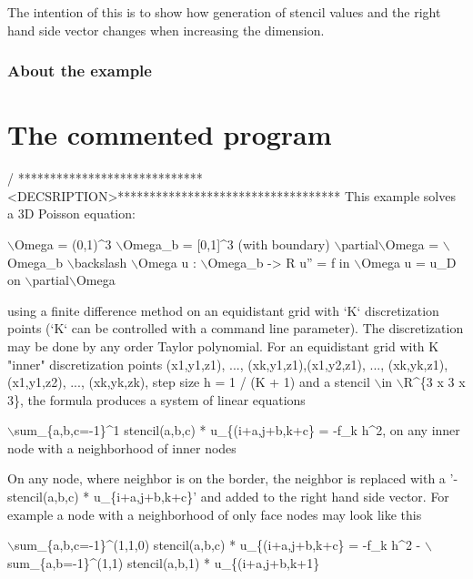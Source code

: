 The intention of this is to show how generation of stencil values and the right hand side vector changes when increasing the dimension.

\label{_Abouttheexample}%
\subsubsection*{About the example }

\label{_CommProg}%
 \section*{The commented program}


\begin{DoxyCode}
/ *****************************<DECSRIPTION>***********************************
This example solves a 3D Poisson equation:

    \(\backslash\)Omega = (0,1)^3
    \(\backslash\)Omega\_b = [0,1]^3   (with boundary)
    \(\backslash\)partial\(\backslash\)Omega = \(\backslash\)Omega\_b \(\backslash\)backslash \(\backslash\)Omega
    u : \(\backslash\)Omega\_b -> R
    u\textcolor{stringliteral}{''} = f in \(\backslash\)Omega
    u = u\_D on \(\backslash\)partial\(\backslash\)Omega

\textcolor{keyword}{using} a finite difference method on an equidistant grid with `K` discretization
points (`K` can be controlled with a command line parameter). The discretization
may be done by any order Taylor polynomial.
For an equidistant grid with K \textcolor{stringliteral}{"inner"} discretization points (x1,y1,z1), ...,
(xk,y1,z1),(x1,y2,z1), ..., (xk,yk,z1), (x1,y1,z2), ..., (xk,yk,zk), step size h
= 1 / (K + 1) and a stencil \(\backslash\)in \(\backslash\)R^\{3 x 3 x 3\}, the formula produces a system of
linear equations

\(\backslash\)sum\_\{a,b,c=-1\}^1 stencil(a,b,c) * u\_\{(i+a,j+b,k+c\} = -f\_k h^2,  on any inner
node with a neighborhood of inner nodes

On any node, where neighbor is on the border, the neighbor is replaced with a
\textcolor{stringliteral}{'-stencil(a,b,c) * u\_\{i+a,j+b,k+c\}'} and added to the right hand side vector.
For example a node with a neighborhood of only face nodes may look like this

\(\backslash\)sum\_\{a,b,c=-1\}^(1,1,0) stencil(a,b,c) * u\_\{(i+a,j+b,k+c\} = -f\_k h^2 -
\(\backslash\)sum\_\{a,b=-1\}^(1,1) stencil(a,b,1) * u\_\{(i+a,j+b,k+1\}


\end{DoxyCode}

